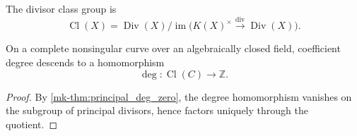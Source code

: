 \begin{definition}
  \label{mk-def:divisor_class_group}
  The divisor class group is
  \[
    \operatorname{Cl}(X)
      =\operatorname{Div}(X)/
        \operatorname{im}\bigl(K(X)^\times
          \xrightarrow{\operatorname{div}}\operatorname{Div}(X)\bigr).
  \]
\end{definition}

\begin{theorem}
  \label{mk-thm:divisor_class_group_degree}
  On a complete nonsingular curve over an algebraically closed field,
  coefficient degree descends to a homomorphism
  \[
    \deg\colon\operatorname{Cl}(C)\longrightarrow\mathbb Z.
  \]
\end{theorem}
\begin{proof}
  By \ref{mk-thm:principal_deg_zero}, the degree homomorphism vanishes on the
  subgroup of principal divisors, hence factors uniquely through the
  quotient.
\end{proof}
